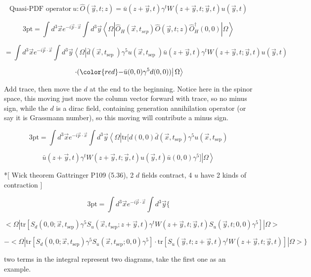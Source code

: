 \documentclass[11pt]{article} %
\begin{document}
\[ \text{Quasi-PDF operator}\ u: \hat{O}(\vec{y}, t ; z)=\bar{u}(z+\vec{y}, t) \gamma^{t} W(z+\vec{y}, t ; \vec{y}, t) u(\vec{y}, t) \]


\[ \text{3pt} = \int d^{3} \vec{x} e^{-i \vec{p} \cdot \vec{x}} \int d^3 \vec{y}\left\langle\Omega\left|\hat{O}_{H}\left(\vec{x}, t_{s e p}\right) \hat{O}(\vec{y}, t ; z) \hat{O}_{H}^{\dagger}(0,0)\right| \Omega\right\rangle \]

\[ = \int d^{3} \vec{x} e^{-i \vec{p} \cdot \vec{x}} \int d^3 \vec{y}\left\langle\Omega\left|\bar{d}\left(\vec{x}, t_{\text {sep }}\right) \gamma^{5} u\left(\vec{x}, t_{\text {sep }}\right) \bar{u}(z+\vec{y}, t) \gamma^{t} W(z+\vec{y}, t ; \vec{y}, t) u(\vec{y}, t) \right.\right.\]

\[\left. \left. \cdot ( {\color{red}-} \bar{u}(0, 0) \gamma^{5} d(0, 0) )  \right| \Omega\right\rangle \]

Add trace, then move the $d$ at the end to the beginning. {\color{red} Notice here in the spinor space, this moving just move the column vector forward with trace, so no minus sign, while the $d$ is a dirac field, containing generation annihilation operator (or say it is Grassmann number), so this moving will contribute a minus sign. }

\[ \text{3pt} = \int d^{3} \vec{x} e^{-i \vec{p} \cdot \vec{x}} \int d^3 \vec{y}\left\langle\Omega\left| \text{tr}[ d(0, 0) \bar{d}\left(\vec{x}, t_{\text {sep}}\right) \gamma^{5} u\left(\vec{x}, t_{\text {sep}}\right)   \right.\right.\]

\[\left. \left. \bar{u}(z+\vec{y}, t) \gamma^{t} W(z+\vec{y}, t ; \vec{y}, t) u(\vec{y}, t)  \bar{u}(0, 0) \gamma^{5}  ] \right| \Omega\right\rangle \]

*[ Wick theorem Gattringer P109 (5.36), 2 $d$ fields contract, 4 $u$ have 2 kinds of contraction ]

\[ \text{3pt} = \int d^{3} \vec{x} e^{-i \vec{p} \cdot \vec{x}} \int d^3 \vec{y} \{ \]

\[ <\Omega| \text{tr}[ S_d(0,0;\vec{x},t_{\text{sep}}) \gamma^{5} S_u(\vec{x},t_{\text{sep}};z+\vec{y},t) \gamma^{t} W(z+\vec{y}, t ; \vec{y}, t) S_u(\vec{y},t;0,0) \gamma^{5}  ] |\Omega> \]

\[ - <\Omega| \text{tr}[ S_d(0,0;\vec{x},t_{\text{sep}}) \gamma^{5} S_u(\vec{x},t_{\text{sep}};0,0) \gamma^{5}] \cdot \text{tr}[ S_u(\vec{y},t;z+\vec{y},t) \gamma^{t} W(z+\vec{y}, t ; \vec{y}, t) ] |\Omega> \} \]

two terms in the integral represent two diagrams, take the first one as an example.
\end{document}
